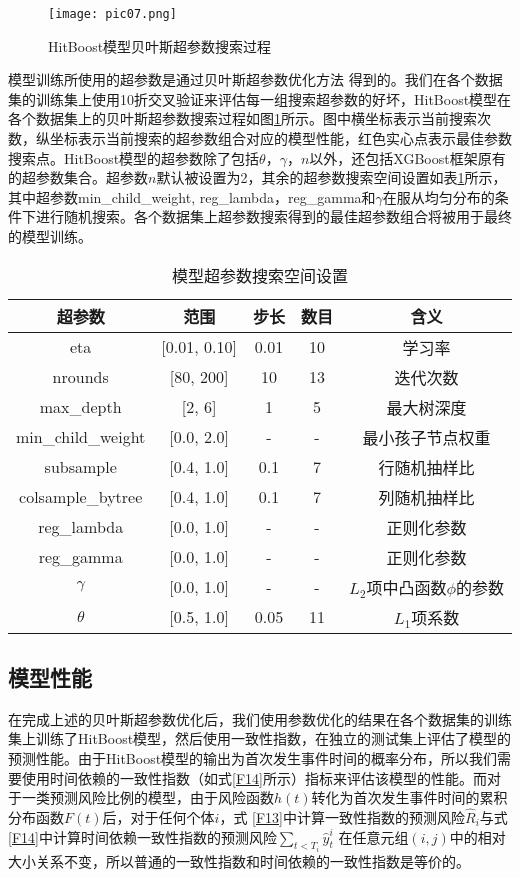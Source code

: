 \begin{figure}[H]
\texttt{[image: pic07.png]}
\caption{HitBoost模型贝叶斯超参数搜索过程}
\label{pic07}
\end{figure}

模型训练所使用的超参数是通过贝叶斯超参数优化方法 得到的。我们在各个数据集的训练集上使用10折交叉验证来评估每一组搜索超参数的好坏，HitBoost模型在各个数据集上的贝叶斯超参数搜索过程如图\ref{pic07}所示。图中横坐标表示当前搜索次数，纵坐标表示当前搜索的超参数组合对应的模型性能，红色实心点表示最佳参数搜索点。HitBoost模型的超参数除了包括$\theta$，$\gamma$，$n$以外，还包括XGBoost框架原有的超参数集合。超参数$n$默认被设置为2，其余的超参数搜索空间设置如表\ref{table03}所示，其中超参数min\_child\_weight, reg\_lambda，reg\_gamma和$\gamma$在服从均匀分布的条件下进行随机搜索。各个数据集上超参数搜索得到的最佳超参数组合将被用于最终的模型训练。

\begin{table}[H]
\caption{模型超参数搜索空间设置}
\begin{tabular}{ccccc}
\toprule
超参数 & 范围 & 步长 & 数目 & 含义 \\ 
\midrule
eta & [0.01, 0.10] & 0.01 & 10 & 学习率 \\
nrounds & [80, 200] & 10 & 13 & 迭代次数 \\
max\_depth & [2, 6] & 1 & 5 & 最大树深度 \\
min\_child\_weight & [0.0, 2.0] & - & - & 最小孩子节点权重 \\
subsample & [0.4, 1.0] & 0.1 & 7 & 行随机抽样比 \\
colsample\_bytree & [0.4, 1.0] & 0.1 & 7 & 列随机抽样比 \\
reg\_lambda & [0.0, 1.0] & - & - & 正则化参数 \\
reg\_gamma & [0.0, 1.0] & - & - & 正则化参数 \\
$\gamma$ & [0.0, 1.0] & - & - & $L_2$项中凸函数$\phi$的参数 \\
$\theta$ & [0.5, 1.0] & 0.05 & 11 & $L_1$项系数 \\
\bottomrule
\end{tabular}
\label{table03}
\end{table}

\subsection{模型性能}

在完成上述的贝叶斯超参数优化后，我们使用参数优化的结果在各个数据集的训练集上训练了HitBoost模型，然后使用一致性指数，在独立的测试集上评估了模型的预测性能。由于HitBoost模型的输出为首次发生事件时间的概率分布，所以我们需要使用时间依赖的一致性指数（如式\eqref{F14}所示）指标来评估该模型的性能。而对于一类预测风险比例的模型，由于风险函数$h(t)$转化为首次发生事件时间的累积分布函数$F(t)$后，对于任何个体$i$，式 \eqref{F13}中计算一致性指数的预测风险$\hat{R}_i$与式 \eqref{F14}中计算时间依赖一致性指数的预测风险$\sum_{t<T_i} \hat{y}_t^i$ 在任意元组$(i,j)$中的相对大小关系不变，所以普通的一致性指数和时间依赖的一致性指数是等价的。

